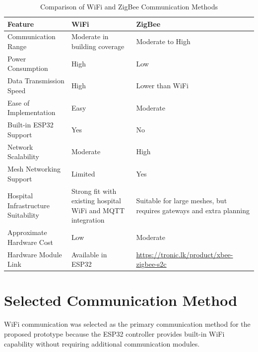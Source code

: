 \documentclass[12pt,a4paper]{report}
\begin{document}
\begin{table}[H]
\centering
\small
\setlength{\tabcolsep}{4pt}
\renewcommand{\arraystretch}{1.15}
\begin{tabularx}{\textwidth}{|>{\raggedright\arraybackslash}p{4cm}|>{\raggedright\arraybackslash}X|>{\raggedright\arraybackslash}X|}
\hline
\textbf{Feature} & \textbf{WiFi} & \textbf{ZigBee} \\
\hline

Communication Range & Moderate in building coverage & Moderate to High \\
\hline

Power Consumption & High & Low \\
\hline

Data Transmission Speed & High & Lower than WiFi \\
\hline

Ease of Implementation & Easy & Moderate \\
\hline

Built-in ESP32 Support & Yes & No \\
\hline

Network Scalability & Moderate & High \\
\hline

Mesh Networking Support & Limited & Yes \\
\hline

Hospital Infrastructure Suitability & Strong fit with existing hospital WiFi and MQTT integration & Suitable for large meshes, but requires gateways and extra planning \\
\hline

Approximate Hardware Cost & Low & Moderate \\
\hline

Hardware Module Link & Available in ESP32 & \url{https://tronic.lk/product/xbee-zigbee-s2c} \\
\hline

\end{tabularx}
\caption{Comparison of WiFi and ZigBee Communication Methods}
\end{table}

\section{Selected Communication Method}

WiFi communication was selected as the primary communication method for the proposed prototype because the ESP32 controller provides built-in WiFi capability without requiring additional communication modules.
\end{document}
